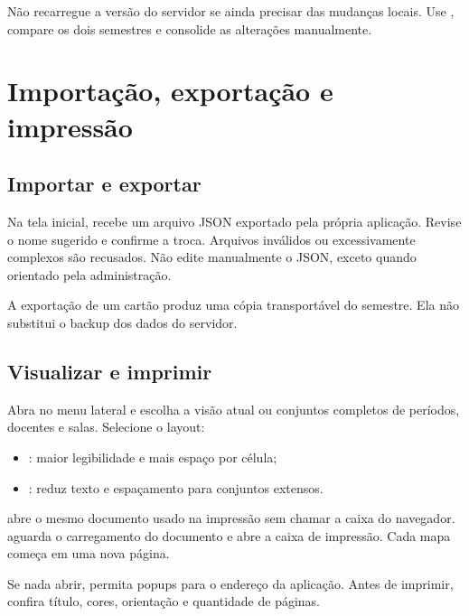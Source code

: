 \begin{dangerbox}
Não recarregue a versão do servidor se ainda precisar das mudanças locais. Use , compare os dois semestres e consolide as alterações manualmente.
\end{dangerbox}

\chapter{Importação, exportação e impressão}

\section{Importar e exportar}

Na tela inicial,  recebe um arquivo JSON exportado pela própria aplicação. Revise o nome sugerido e confirme a troca. Arquivos inválidos ou excessivamente complexos são recusados. Não edite manualmente o JSON, exceto quando orientado pela administração.

A exportação de um cartão produz uma cópia transportável do semestre. Ela não substitui o backup dos dados do servidor.

\section{Visualizar e imprimir}

Abra  no menu lateral e escolha a visão atual ou conjuntos completos de períodos, docentes e salas. Selecione o layout:

\begin{itemize}
  \item {}: maior legibilidade e mais espaço por célula;
  \item {}: reduz texto e espaçamento para conjuntos extensos.
\end{itemize}

 abre o mesmo documento usado na impressão sem chamar a caixa do navegador.  aguarda o carregamento do documento e abre a caixa de impressão. Cada mapa começa em uma nova página.


Se nada abrir, permita popups para o endereço da aplicação. Antes de imprimir, confira título, cores, orientação e quantidade de páginas.

